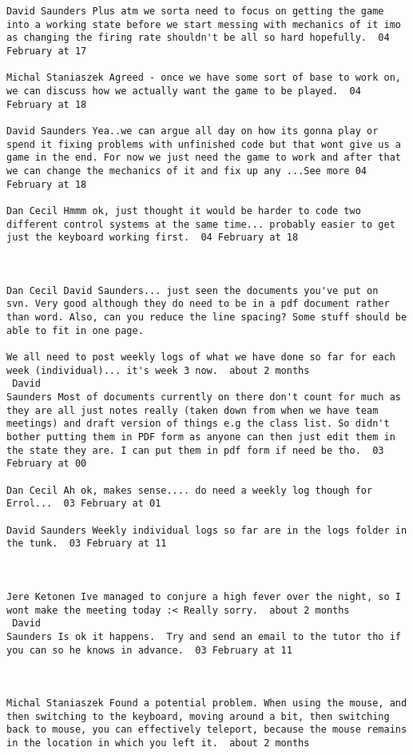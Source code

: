 \documentclass[10pt]{report}
\begin{document}
\begin{verbatim}
David Saunders Plus atm we sorta need to focus on getting the game
into a working state before we start messing with mechanics of it imo
as changing the firing rate shouldn't be all so hard hopefully.  04
February at 17

Michal Staniaszek Agreed - once we have some sort of base to work on,
we can discuss how we actually want the game to be played.  04
February at 18

David Saunders Yea..we can argue all day on how its gonna play or
spend it fixing problems with unfinished code but that wont give us a
game in the end. For now we just need the game to work and after that
we can change the mechanics of it and fix up any ...See more 04
February at 18

Dan Cecil Hmmm ok, just thought it would be harder to code two
different control systems at the same time... probably easier to get
just the keyboard working first.  04 February at 18



Dan Cecil David Saunders... just seen the documents you've put on
svn. Very good although they do need to be in a pdf document rather
than word. Also, can you reduce the line spacing? Some stuff should be
able to fit in one page.

We all need to post weekly logs of what we have done so far for each
week (individual)... it's week 3 now.  about 2 months 
 David
Saunders Most of documents currently on there don't count for much as
they are all just notes really (taken down from when we have team
meetings) and draft version of things e.g the class list. So didn't
bother putting them in PDF form as anyone can then just edit them in
the state they are. I can put them in pdf form if need be tho.  03
February at 00

Dan Cecil Ah ok, makes sense.... do need a weekly log though for
Errol...  03 February at 01

David Saunders Weekly individual logs so far are in the logs folder in
the tunk.  03 February at 11



Jere Ketonen Ive managed to conjure a high fever over the night, so I
wont make the meeting today :< Really sorry.  about 2 months 
 David
Saunders Is ok it happens.  Try and send an email to the tutor tho if
you can so he knows in advance.  03 February at 11



Michal Staniaszek Found a potential problem. When using the mouse, and
then switching to the keyboard, moving around a bit, then switching
back to mouse, you can effectively teleport, because the mouse remains
in the location in which you left it.  about 2 months 



\end{verbatim}
\end{document}
